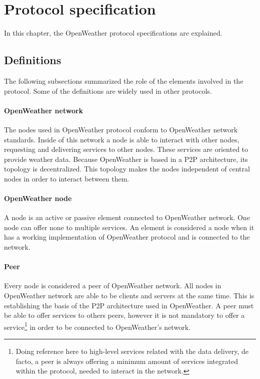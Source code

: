 
\chapter{Protocol specification}

In this chapter, the OpenWeather protocol specifications are explained. 

\section{Definitions}

The following subsections summarized the role of the elements involved in the protocol. Some of the definitions are widely used in other protocols.

\subsubsection{OpenWeather network}

The nodes used in OpenWeather protocol conform to OpenWeather network standards. Inside of this network a node is able to interact with other nodes, requesting and delivering services to other nodes. These services are oriented to provide weather data. Because OpenWeather is based in a \gls{P2P} architecture, its topology is decentralized. This topology makes the nodes independent of central nodes in order to interact between them.

\subsubsection{OpenWeather node}

A node is an active or passive element connected to OpenWeather network. One node can offer none to multiple services. An element is considered a node when it has a working implementation of OpenWeather protocol and is connected to the network.

\subsubsection{Peer}

Every node is considered a peer of OpenWeather network. All nodes in OpenWeather network are able to be clients and servers at the same time. This is establishing the basis of the \gls{P2P} architecture used in OpenWeather. A peer must be able to offer services to others peers, however it is not mandatory to offer a service\footnote{Doing reference here to high-level services related with the data delivery, de facto, a peer is always offering a minimum amount of services integrated within the protocol, needed to interact in the network.} in order to be connected to OpenWeather's network.

